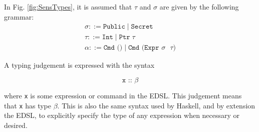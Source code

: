 \documentclass[10pt, conference]{IEEEtran}
\newcommand{\ttt}{\texttt}
\begin{document}
In Fig. \ref{fig:SensTypes}, it is assumed that $\tau$ and $\sigma$ are given by the
following grammar:
\begin{gather*}
  \sigma ::= \ttt{Public}\;|\;\ttt{Secret}\\
  \tau ::= \ttt{Int}\;|\;\ttt{Ptr}\;\tau\\
  \alpha ::= \ttt{Cmd ()}\;|\;\ttt{Cmd (Expr $\sigma$ $\tau$)}
\end{gather*}

A typing judgement is expressed with the syntax

\begin{equation*}
  \ttt{x :: $\beta$}
\end{equation*}

where \ttt{x} is some expression or command in the EDSL. This judgement means
that \ttt{x} has type $\beta$. This is also the same syntax used by Haskell, and by extension
the EDSL, to explicitly specify the type of any expression when necessary or desired.
\end{document}
